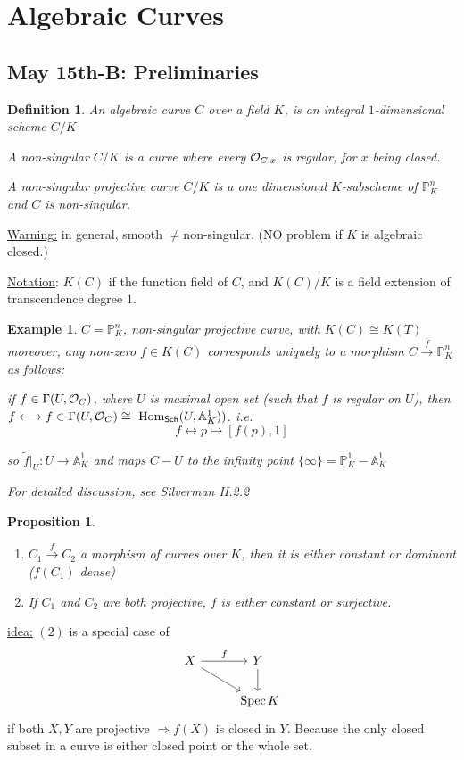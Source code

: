 \documentclass[11pt]{article}
\newtheorem{prop}[thm]{Proposition}
\newtheorem{dfn}[thm]{Definition}
\newtheorem{ex}[thm]{Example}
\renewcommand{\hom}{\text{ Hom}}
\newcommand{\spec}{\text{ Spec}\,}
\newcommand{\affn}{\mathbb A}
\newcommand{\proj}{\mathbb P}
\newcommand{\calo}{{\cal O}}
\newcommand{\Lrta}{\Longrightarrow}
\newcommand{\lrta}{\longrightarrow}
\newcommand{\llrta}{\longleftrightarrow}
\begin{document}
\section{Algebraic Curves}
\subsection{May 15th-B: Preliminaries}
\begin{dfn}
An algebraic curve $C$ over a field $K$, is an integral $1$-dimensional scheme $C/K$

A non-singular $C/K$ is a curve where every $\calo_{C,x}$ is regular, for $x$  being closed.

A non-singular projective curve $C/K$ is  a one dimensional $K$-subscheme of $\proj^n_K$ and $C$ is non-singular.
\end{dfn}
\underline{Warning:} in general, smooth $\neq $non-singular. (NO problem if $K$ is algebraic closed.)

\underline{Notation}: $K(C)$ if the function field of $C$, and  $K(C)/K$
 is a field extension of transcendence degree $1$. 

 \begin{ex}
 $C=\proj^n_K$, non-singular projective curve, with $K(C)\cong K(T)$ moreover, any non-zero $f\in K(C)$ corresponds uniquely to a morphism $C\overset{\overline{f}}{\lrta}\proj^n_K$ as follows:
 
 if $f\in \Gamma(U,\calo_C)$, where $U$ is maximal open set (such that $f$ is regular on $U$), then  $f\llrta f\in \Gamma(U,\calo_C)\cong \hom_{\mathsf{Sch}}(U,\affn^1_K))$. i.e.
 $$
f\llrta p\mapsto [f(p),1]
 $$

 so $\tilde{f}|_U:U\lrta \affn^1_K$ and maps $C-U$ to the infinity point $\{\infty\}=\proj^1_K-\affn^1_K$

 For detailed discussion, see Silverman II.2.2
 \end{ex}
 \begin{prop}
\begin{enumerate}[label=(\arabic*)]
\item $C_1\overset{f}{\lrta}C_2$ a morphism of curves over $K$, then it is either constant or dominant ($f(C_1)$ dense)
\item If $C_1$ and $C_2$ are both projective, $f$ is either constant or surjective. 
\end{enumerate}
 \end{prop}
\underline{idea:} $(2)$ is a special case of 
$$
\begin{tikzcd}
X \arrow[rd] \arrow[r, "f"] & Y \arrow[d] \\
 & \spec K
\end{tikzcd}
$$
if both $X,Y$ are projective $\Lrta f(X)$ is closed in $Y$. Because the only closed subset in a curve is either closed point or the whole set.
\end{document}
